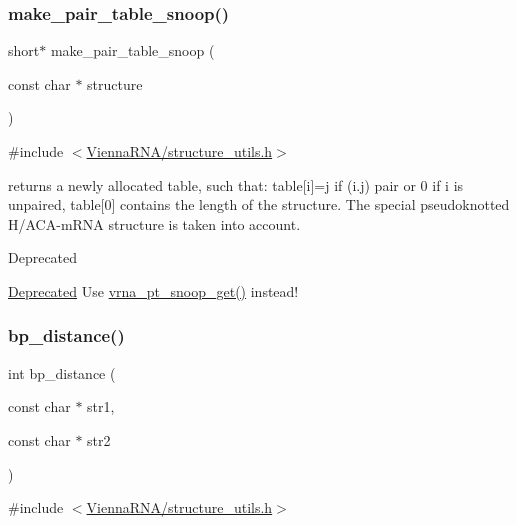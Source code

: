 \subsubsection{\texorpdfstring{make\+\_\+pair\+\_\+table\+\_\+snoop()}{make\_pair\_table\_snoop()}}
{\footnotesize\ttfamily short$\ast$ make\+\_\+pair\+\_\+table\+\_\+snoop (\begin{DoxyParamCaption}\item[{const char $\ast$}]{structure }\end{DoxyParamCaption})}



{\ttfamily \#include $<$\hyperlink{structure__utils_8h}{Vienna\+R\+N\+A/structure\+\_\+utils.\+h}$>$}

returns a newly allocated table, such that\+: table\mbox{[}i\mbox{]}=j if (i.\+j) pair or 0 if i is unpaired, table\mbox{[}0\mbox{]} contains the length of the structure. The special pseudoknotted H/\+A\+C\+A-\/m\+R\+NA structure is taken into account. \begin{DoxyRefDesc}{Deprecated}
\item[\hyperlink{deprecated__deprecated000143}{Deprecated}]Use \hyperlink{group__struct__utils_gaef0f7e1a6c00c81a349973de53039dda}{vrna\+\_\+pt\+\_\+snoop\+\_\+get()} instead! \end{DoxyRefDesc}
\mbox{\label{group__struct__utils_ga6ebbcd29a754f0e4f1a66d1fd84184db}} 
\subsubsection{\texorpdfstring{bp\+\_\+distance()}{bp\_distance()}}
{\footnotesize\ttfamily int bp\+\_\+distance (\begin{DoxyParamCaption}\item[{const char $\ast$}]{str1,  }\item[{const char $\ast$}]{str2 }\end{DoxyParamCaption})}



{\ttfamily \#include $<$\hyperlink{structure__utils_8h}{Vienna\+R\+N\+A/structure\+\_\+utils.\+h}$>$}



